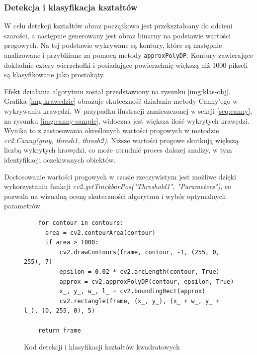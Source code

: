 \subsubsection{Detekcja i klasyfikacja kształtów}

W celu detekcji kształtów obraz początkowo jest przekształcany do odcieni szarości, a następnie generowany jest obraz binarny na podstawie wartości progowych. Na tej podstawie wykrywane są kontury, które są następnie analizowane i przybliżane za pomocą metody \texttt{approxPolyDP}. Kontury zawierające dokładnie cztery wierzchołki i posiadające powierzchnię większą niż 1000 pikseli są klasyfikowane jako prostokąty.

Efekt działania algorytmu został przedstawiony na rysunku \ref{img:klas-obj}. Grafika \ref{img:krawedzie} obrazuje skuteczność działania metody Canny’ego w wykrywaniu krawędzi. W przypadku ilustracji zamieszczonej w sekcji \ref{seq:canny}, na rysunku \ref{img:canny-sample}, widoczna jest większa ilość wykrytych krawędzi. Wynika to z zastosowania określonych wartości progowych w metodzie \textit{cv2.Canny(gray, thresh1, thresh2)}. Niższe wartości progowe skutkują większą liczbą wykrytych krawędzi, co może utrudnić proces dalszej analizy, w tym identyfikacji oczekiwanych obiektów.

Dostosowanie wartości progowych w czasie rzeczywistym jest możliwe dzięki wykorzystaniu funkcji \textit{cv2.getTrackbarPos("Threshold1", "Parameters")}, co pozwala na wizualną ocenę skuteczności algorytmu i wybór optymalnych parametrów.

\begin{figure}[H]
  \centering
  \begin{lstlisting}
    for contour in contours:
      area = cv2.contourArea(contour)
      if area > 1000:
          cv2.drawContours(frame, contour, -1, (255, 0, 255), 7)
          epsilon = 0.02 * cv2.arcLength(contour, True)
          approx = cv2.approxPolyDP(contour, epsilon, True)
          x_, y_, w_, l_ = cv2.boundingRect(approx)
          cv2.rectangle(frame, (x_, y_), (x_ + w_, y_ + l_), (0, 255, 0), 5)

    return frame
  \end{lstlisting}
  \caption{Kod detekcji i klasyfikacji kształtów kwadratowych}
  \label{fig:square_detection}
\end{figure}

